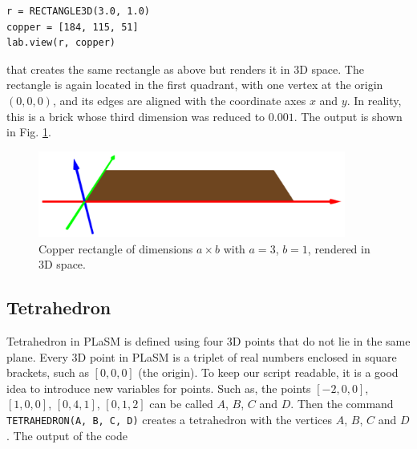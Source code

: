 \begin{bbox}
\begin{verbatim}
r = RECTANGLE3D(3.0, 1.0)
copper = [184, 115, 51]
lab.view(r, copper)
\end{verbatim}
\end{bbox}
\vspace{6mm}

\noindent
that creates the same rectangle as above but renders it in 3D space.
The rectangle is again located in the first quadrant, with one vertex 
at the origin $(0, 0, 0)$, and its edges are aligned with the coordinate
axes $x$ and $y$. In reality, this is a brick whose third dimension was
reduced to $0.001$. The output is shown in Fig. \ref{fig:rect-111}.

\begin{figure}[!ht]
\begin{center}
\includegraphics[width=0.9\textwidth]{img/rect-111.png}
\end{center}
\vspace{-4mm}
\caption{Copper rectangle of dimensions $a \times b$ with $a = 3$, $b = 1$, rendered in 3D space.}
\label{fig:rect-111}
\vspace{-1cm}
\end{figure}
\noindent
\newpage



\subsection{Tetrahedron}

Tetrahedron in PLaSM is defined using four 3D points that do not lie in the same 
plane. Every 3D point in PLaSM is a triplet of real numbers enclosed in square brackets, such as $[0, 0, 0]$ (the 
origin). To keep our script readable, it is a good idea to introduce new variables
for points. Such as, the points $[-2, 0, 0]$, $[1, 0, 0]$, $[0, 4, 1]$, $[0, 1, 2]$
can be called $A$, $B$, $C$ and $D$. 
Then the command {\tt TETRAHEDRON(A, B, C, D)} creates a tetrahedron with the vertices 
$A$, $B$, $C$ and $D$. The output of the code\\

